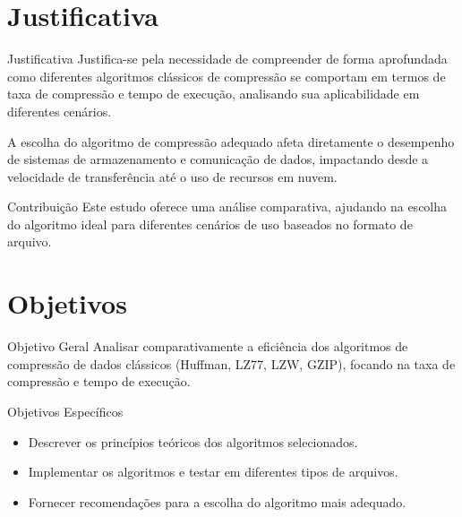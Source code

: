 \documentclass{beamer}
\begin{document}
    \section{Justificativa}
    \begin{frame}{Justificativa}
    Justifica-se pela necessidade de compreender de forma aprofundada como diferentes algoritmos clássicos de compressão
    se comportam em termos de taxa de compressão e tempo de execução, analisando sua aplicabilidade em diferentes
    cenários.     

    A escolha do algoritmo de compressão adequado afeta diretamente o desempenho de sistemas de armazenamento e comunicação de dados, impactando desde a velocidade de transferência até o uso de recursos em nuvem.
        
        \begin{block}{Contribuição}
            Este estudo oferece uma análise comparativa, ajudando na escolha do algoritmo ideal para diferentes cenários de uso baseados no formato de arquivo.
        \end{block}
    \end{frame}

    \section{Objetivos}
    \begin{frame}{Objetivo Geral}
        Analisar comparativamente a eficiência dos algoritmos de compressão de dados clássicos (Huffman, LZ77, LZW, GZIP), focando na taxa de compressão e tempo de execução.
    \end{frame}
    
    \begin{frame}{Objetivos Específicos}
        \begin{itemize}
            \item Descrever os princípios teóricos dos algoritmos selecionados.
            \item Implementar os algoritmos e testar em diferentes tipos de arquivos.
            \item Fornecer recomendações para a escolha do algoritmo mais adequado.
        \end{itemize}
    \end{frame}
\end{document}
